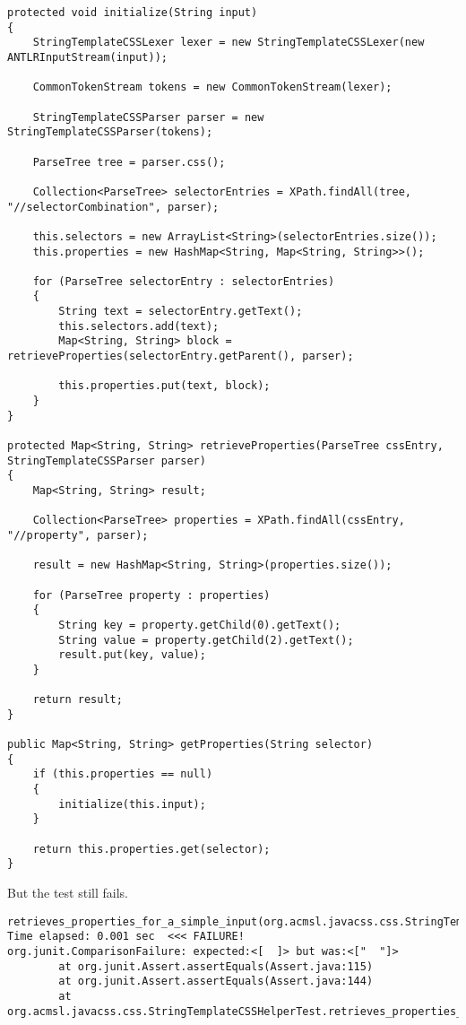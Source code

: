 \documentclass[11pt]{article}
\begin{document}
\begin{verbatim}
protected void initialize(String input)
{
    StringTemplateCSSLexer lexer = new StringTemplateCSSLexer(new ANTLRInputStream(input));

    CommonTokenStream tokens = new CommonTokenStream(lexer);

    StringTemplateCSSParser parser = new StringTemplateCSSParser(tokens);

    ParseTree tree = parser.css();

    Collection<ParseTree> selectorEntries = XPath.findAll(tree, "//selectorCombination", parser);

    this.selectors = new ArrayList<String>(selectorEntries.size());
    this.properties = new HashMap<String, Map<String, String>>();

    for (ParseTree selectorEntry : selectorEntries)
    {
        String text = selectorEntry.getText();
        this.selectors.add(text);
        Map<String, String> block = retrieveProperties(selectorEntry.getParent(), parser);

        this.properties.put(text, block);
    }
}

protected Map<String, String> retrieveProperties(ParseTree cssEntry, StringTemplateCSSParser parser)
{
    Map<String, String> result;

    Collection<ParseTree> properties = XPath.findAll(cssEntry, "//property", parser);

    result = new HashMap<String, String>(properties.size());

    for (ParseTree property : properties)
    {
        String key = property.getChild(0).getText();
        String value = property.getChild(2).getText();
        result.put(key, value);
    }

    return result;
}

public Map<String, String> getProperties(String selector)
{
    if (this.properties == null)
    {
        initialize(this.input);
    }

    return this.properties.get(selector);
}
\end{verbatim}

But the test still fails.

\begin{verbatim}
retrieves_properties_for_a_simple_input(org.acmsl.javacss.css.StringTemplateCSSHelperTest)  Time elapsed: 0.001 sec  <<< FAILURE!
org.junit.ComparisonFailure: expected:<[  ]> but was:<["  "]>
        at org.junit.Assert.assertEquals(Assert.java:115)
        at org.junit.Assert.assertEquals(Assert.java:144)
        at org.acmsl.javacss.css.StringTemplateCSSHelperTest.retrieves_properties_for_a_simple_input(StringTemplateCSSHelperTest.java:128)
\end{verbatim}
\end{document}
